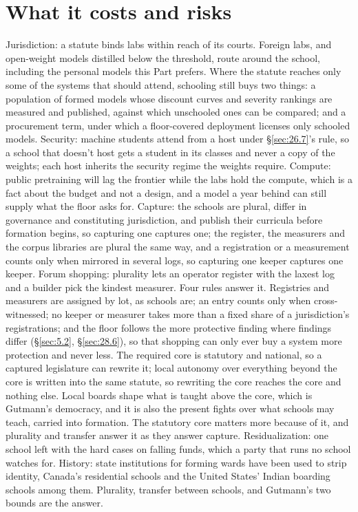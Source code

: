 \section{What it costs and risks}
\label{sec:26.10}
Jurisdiction: a statute binds labs within reach of its courts. Foreign labs, and open-weight models distilled below the threshold, route around the school, including the personal models this Part prefers. Where the statute reaches only some of the systems that should attend, schooling still buys two things: a population of formed models whose discount curves and severity rankings are measured and published, against which unschooled ones can be compared; and a procurement term, under which a floor-covered deployment licenses only schooled models. Security: machine students attend from a host under \S\ref{sec:26.7}'s rule, so a school that doesn't host gets a student in its classes and never a copy of the weights; each host inherits the security regime the weights require. Compute: public pretraining will lag the frontier while the labs hold the compute, which is a fact about the budget and not a design, and a model a year behind can still supply what the floor asks for. Capture: the schools are plural, differ in governance and constituting jurisdiction, and publish their curricula before formation begins, so capturing one captures one; the register, the measurers and the corpus libraries are plural the same way, and a registration or a measurement counts only when mirrored in several logs, so capturing one keeper captures one keeper. Forum shopping: plurality lets an operator register with the laxest log and a builder pick the kindest measurer. Four rules answer it. Registries and measurers are assigned by lot, as schools are; an entry counts only when cross-witnessed; no keeper or measurer takes more than a fixed share of a jurisdiction's registrations; and the floor follows the more protective finding where findings differ (\S\ref{sec:5.2}, \S\ref{sec:28.6}), so that shopping can only ever buy a system more protection and never less. The required core is statutory and national, so a captured legislature can rewrite it; local autonomy over everything beyond the core is written into the same statute, so rewriting the core reaches the core and nothing else. Local boards shape what is taught above the core, which is Gutmann's democracy, and it is also the present fights over what schools may teach, carried into formation. The statutory core matters more because of it, and plurality and transfer answer it as they answer capture. Residualization: one school left with the hard cases on falling funds, which a party that runs no school watches for. History: state institutions for forming wards have been used to strip identity, Canada's residential schools and the United States' Indian boarding schools among them. Plurality, transfer between schools, and Gutmann's two bounds are the answer.
